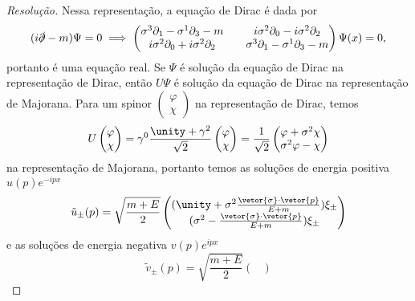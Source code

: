 \begin{proof}[Resolução]
    Nessa representação, a equação de Dirac é dada por
    \begin{equation*}
        (i \slashed{\partial} - m) \Psi = 0 \implies \begin{pmatrix}
            \sigma^3 \partial_1 - \sigma^1 \partial_3 - m && i\sigma^2 \partial_0 - i\sigma^2 \partial_2\\
            i \sigma^2 \partial_0 + i \sigma^2 \partial_2 && \sigma^3 \partial_1 - \sigma^1 \partial_3 - m
        \end{pmatrix}
        \Psi(x) = 0,
    \end{equation*}
    portanto é uma equação real. Se \(\Psi\) é solução da equação de Dirac na representação de Dirac, então \(U\Psi\) é solução da equação de Dirac na representação de Majorana. Para um spinor \((\begin{smallmatrix} \varphi\\\chi \end{smallmatrix})\) na representação de Dirac, temos
    \begin{equation*}
        U \begin{pmatrix}
            \varphi\\\chi
        \end{pmatrix} = \gamma^0\frac{\unity + \gamma^2}{\sqrt{2}} \begin{pmatrix}
            \varphi\\\chi
        \end{pmatrix} = \frac{1}{\sqrt{2}} \begin{pmatrix}
            \varphi + \sigma^2 \chi\\
            \sigma^2\varphi - \chi
        \end{pmatrix}
    \end{equation*}
    na representação de Majorana, portanto temos as soluções de energia positiva \(u(p) e^{-ipx}\)
    \begin{equation*}
        \tilde{u}_{\pm}(p) = \sqrt{\frac{m + E}2}  \begin{pmatrix}
            (\unity + \sigma^2\frac{\vetor{\sigma}\cdot\vetor{p}}{E + m})\xi_\pm \\
            (\sigma^2 - \frac{\vetor{\sigma}\cdot\vetor{p}}{E + m}) \xi_\pm
        \end{pmatrix}
    \end{equation*}
    e as soluções de energia negativa \(v(p) e^{ipx}\)
    \begin{equation*}
        \tilde{v}_{\pm}(p) = \sqrt{\frac{m + E}2}\begin{pmatrix}

\end{pmatrix}
\end{equation*}
\end{proof}
